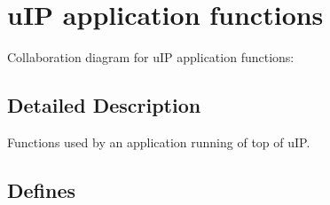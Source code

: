 \hypertarget{a00064}{
\section{u\-IP application functions}
\label{a00064}
}


Collaboration diagram for u\-IP application functions:

\subsection{Detailed Description}
Functions used by an application running of top of u\-IP. 



\subsection*{Defines}
